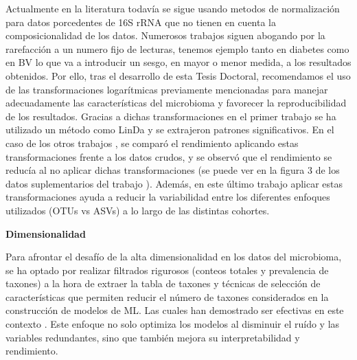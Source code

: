 Actualmente en la literatura todavía se sigue usando metodos de normalización para datos porcedentes de 16S rRNA que no tienen en cuenta la composicionalidad de los datos. Numerosos trabajos siguen abogando por la rarefacción a un numero fijo de lecturas, tenemos ejemplo tanto en diabetes \cite{lambeth2015composition, dash2023functional, siptroth2023variation} como en BV \cite{chen2018vaginal, onywera2021predictive} lo que va a introducir un sesgo, en mayor o menor medida, a los resultados obtenidos. Por ello, tras el desarrollo de esta Tesis Doctoral, recomendamos el uso de las transformaciones logarítmicas previamente mencionadas para manejar adecuadamente las características del microbioma y favorecer la reproducibilidad de los resultados. Gracias a dichas transformaciones en el primer trabajo \cite{paper1} se ha utilizado un método como LinDa y se extrajeron patrones significativos. En el caso de los otros trabajos \cite{paper2, paper3}, se comparó el rendimiento aplicando estas transformaciones frente a los datos crudos, y se observó que el rendimiento se reducía al no aplicar dichas transformaciones (se puede ver en la figura 3 de los datos suplementarios del trabajo \cite{paper3}). Además, en este último trabajo aplicar estas transformaciones ayuda a reducir la variabilidad entre los diferentes enfoques utilizados (OTUs vs ASVs) a lo largo de las distintas cohortes.

\textbf{Dimensionalidad}

Para afrontar el desafío de la alta dimensionalidad en los datos del microbioma, se ha optado por realizar filtrados rigurosos (conteos totales y prevalencia de taxones) a la hora de extraer la tabla de taxones y técnicas de selección de características que permiten reducir el número de taxones considerados en la construcción de modelos de ML. Las cuales han demostrado ser efectivas en este contexto \cite{segata2011metagenomic}. Este enfoque no solo optimiza los modelos al disminuir el ruído y las variables redundantes, sino que también mejora su interpretabilidad y rendimiento. 

